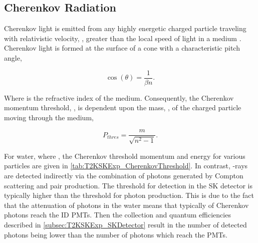 \subsection{Cherenkov Radiation}
\label{subsec:T2KSKExp_Cherenkov}

Cherenkov light is emitted from any highly energetic charged particle traveling with relativistic velocity, \quickmath{\beta}, greater than the local speed of light in a medium \cite{Cerenkov1937-tl}.
Cherenkov light is formed at the surface of a cone with a characteristic pitch angle,

\begin{equation}
  \label{eq:T2KSKExp_CherenkovConeAngle}
  \cos(\theta)=\frac{1}{\beta n}.
\end{equation}

Where  is the refractive index of the medium. Consequently, the Cherenkov momentum threshold, , is dependent upon the mass, , of the charged particle moving through the medium, 

\begin{equation}
  P_{thres} = \frac{m}{\sqrt{n^{2}-1}}.
\end{equation}

For water, where , the Cherenkov threshold momentum and energy for various particles are given in \autoref{tab:T2KSKExp_CherenkovThreshold}. In contrast, \quickmath{\gamma}-rays are detected indirectly via the combination of photons generated by Compton scattering and pair production. The threshold for detection in the SK detector is typically higher than the threshold for photon production. This is due to the fact that the attenuation of photons in the water means that typically  of Cherenkov photons reach the ID PMTs. Then the collection and quantum efficiencies described in \autoref{subsec:T2KSKExp_SKDetector} result in the number of detected photons being lower than the number of photons which reach the PMTs. 

